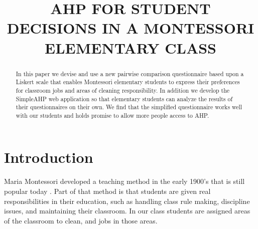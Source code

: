\documentclass[11pt]{article}
\title{AHP FOR STUDENT DECISIONS IN A MONTESSORI ELEMENTARY CLASS}
\renewcommand{\maketitle}{\begin{center}{\Large \textbf{\thetitle}} \end{center}}
\begin{document}
\maketitle
\thispagestyle{fancy}

\begin{abstract}
In this paper we devise and use a new pairwise comparison questionnaire based upon a
Liskert scale that enables
Montessori elementary students to express their preferences for classroom jobs and
areas of cleaning responsibility.  In addition we develop the SimpleAHP web application
so that elementary students can analyze the results of their questionnaires on their
own.  We find that the simplified questionnaire works well with our students and holds
promise to allow more people access to AHP.


\end{abstract}


\section{Introduction}
Maria Montessori developed a teaching method in the early 1900's that is still popular today \citep{montessori2013montessori}.  Part of that method is that students are given real responsibilities in their education, such as handling class rule making, discipline issues, and  maintaining their classroom. In our class students are assigned areas of the classroom to clean, and jobs in those areas.
\end{document}
